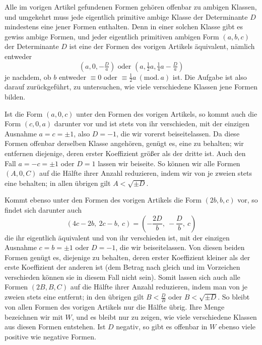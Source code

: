 Alle im vorigen Artikel gefundenen Formen gehören offenbar zu ambigen Klassen, und umgekehrt muss jede eigentlich primitive ambige Klasse der Determinante \(D\) mindestens eine jener Formen enthalten. Denn in einer solchen Klasse gibt es gewiss ambige Formen, und jeder eigentlich primitiven ambigen Form \((a,b,c)\) der Determinante \(D\) ist eine der Formen des vorigen Artikels äquivalent, nämlich entweder
\[
(a,0,-\tfrac{D}{a})\text{ oder }(a,\tfrac12 a,\tfrac14 a-\tfrac{D}{a})
\]
je nachdem, ob \(b\) entweder \(\equiv0\) oder \(\equiv\frac12 a\ (\mathrm{mod.}\,a)\) ist. Die Aufgabe ist also darauf zurückgeführt, zu untersuchen, wie viele verschiedene Klassen jene Formen bilden.

Ist die Form \((a,0,c)\) unter den Formen des vorigen Artikels, so kommt auch die Form \((c,0,a)\) darunter vor und ist stets von ihr verschieden, mit der einzigen Ausnahme \(a=c=\pm1\), also \(D=-1\), die wir vorerst beiseitelassen. Da diese Formen offenbar derselben Klasse angehören, genügt es, eine zu behalten; wir entfernen diejenige, deren erster Koeffizient größer als der dritte ist. Auch den Fall \(a=-c=\pm1\) oder \(D=1\) lassen wir beiseite. So können wir alle Formen
$(A,0,C)$ auf die Hälfte ihrer Anzahl reduzieren, indem wir von je zweien stets eine behalten; in allen übrigen gilt $A<\sqrt{\pm D}$.

Kommt ebenso unter den Formen des vorigen Artikels die Form $(2b,b,c)$ vor, so findet sich darunter auch
\[
(4c-2b,\ 2c-b,\ c)=\left(-\frac{2D}{b},\ -\frac{D}{b},\ c\right)
\]
die ihr eigentlich äquivalent und von ihr verschieden ist, mit der einzigen Ausnahme $c=b=\pm1$ oder $D=-1$, die wir beiseitelassen. Von diesen beiden Formen genügt es, diejenige zu behalten, deren erster Koeffizient kleiner als der erste Koeffizient der anderen ist (dem Betrag nach gleich und im Vorzeichen verschieden können sie in diesem Fall nicht sein). Somit lassen sich auch alle Formen $(2B,B,C)$ auf die Hälfte ihrer Anzahl reduzieren, indem man von je zweien stets eine entfernt; in den übrigen gilt $B<\frac{D}{B}$ oder $B<\sqrt{\pm D}$. So bleibt von allen Formen des vorigen Artikels nur die Hälfte übrig. Ihre Menge bezeichnen wir mit $W$, und es bleibt nur zu zeigen, wie viele verschiedene Klassen aus diesen Formen entstehen. Ist $D$ negativ, so gibt es offenbar in $W$ ebenso viele positive wie negative Formen.

